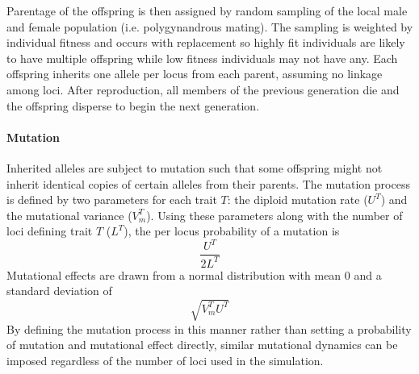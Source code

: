 \documentclass[12pt, oneside]{article}
\begin{document}
Parentage of the offspring is then assigned by random sampling of the local male and female population (i.e. polygynandrous mating). The sampling is weighted by individual fitness and occurs with replacement so highly fit individuals are likely to have multiple offspring while low fitness individuals may not have any. Each offspring inherits one allele per locus from each parent, assuming no linkage among loci. After reproduction, all members of the previous generation die and the offspring disperse to begin the next generation.

\paragraph{Mutation}
Inherited alleles are subject to mutation such that some offspring might not inherit identical copies of certain alleles from their parents. The mutation process is defined by two parameters for each trait $T$: the diploid mutation rate ($U^{T}$) and the mutational variance ($V_{m}^{T}$). Using these parameters along with the number of loci defining trait $T$ ($L^{T}$), the per locus probability of a mutation is
\begin{equation}
\frac{U^{T}}{2L^{T}}
\end{equation}
Mutational effects are drawn from a normal distribution with mean $0$ and a standard deviation of
\begin{equation}
\sqrt{V_{m}^{T}U^{T}}
\end{equation}
By defining the mutation process in this manner rather than setting a probability of mutation and mutational effect directly, similar mutational dynamics can be imposed regardless of the number of loci used in the simulation.
\end{document}
